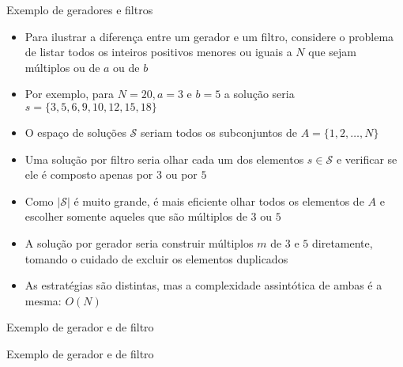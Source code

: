 \begin{frame}[fragile]{Exemplo de geradores e filtros}

    \begin{itemize}
        \item Para ilustrar a diferença entre um gerador e um filtro, considere o problema de
            listar todos os inteiros positivos menores ou iguais a $N$ que sejam múltiplos ou
            de $a$ ou de $b$

        \item Por exemplo, para $N = 20, a = 3$ e $b = 5$ a solução seria 
            $s = \lbrace 3, 5, 6, 9, 10, 12, 15, 18\rbrace$

        \item O espaço de soluções $\mathcal{S}$ seriam todos os subconjuntos de 
            $A = \lbrace 1, 2, \ldots, N\rbrace$

        \item Uma solução por filtro seria olhar cada um dos elementos $s\in \mathcal{S}$ e 
            verificar se ele é composto apenas por $3$ ou por $5$

        \item Como $|\mathcal{S}|$ é muito grande, é mais eficiente olhar todos os elementos de
            $A$ e escolher somente aqueles que são múltiplos de $3$ ou $5$
 
        \item A solução por gerador seria construir múltiplos $m$ de $3$ e $5$ diretamente, 
            tomando o cuidado de excluir os elementos duplicados

        \item As estratégias são distintas, mas a complexidade assintótica de ambas é a 
            mesma: $O(N)$
    \end{itemize}

\end{frame}

\begin{frame}[fragile]{Exemplo de gerador e de filtro}
\end{frame}

\begin{frame}[fragile]{Exemplo de gerador e de filtro}
\end{frame}
